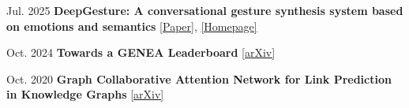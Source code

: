 \begin{samepage}
	
\begin{twocolentry}{Jul. 2025}
	\textbf{DeepGesture: A conversational gesture synthesis system based on
		emotions and semantics} \href{https://hmthanh.github.io/file/DeepGesture_Paper.pdf}{[Paper]}, \href{https://deepgesture.github.io/}{[Homepage]}
	
	\vspace{0.10 cm}
\end{twocolentry}


\begin{twocolentry}{Oct. 2024}
	\textbf{Towards a GENEA Leaderboard} \href{https://arxiv.org/abs/2410.06327}{[arXiv]}
	
	\vspace{0.10 cm}
	
\end{twocolentry}


\begin{twocolentry}{Oct. 2020}
	\textbf{Graph Collaborative Attention Network for Link Prediction in Knowledge Graphs} \href{https://hmthanh.github.io/file/GCAT_Paper.pdf}{[arXiv]}
	\vspace{0.10 cm}
	
\end{twocolentry}
\end{samepage}